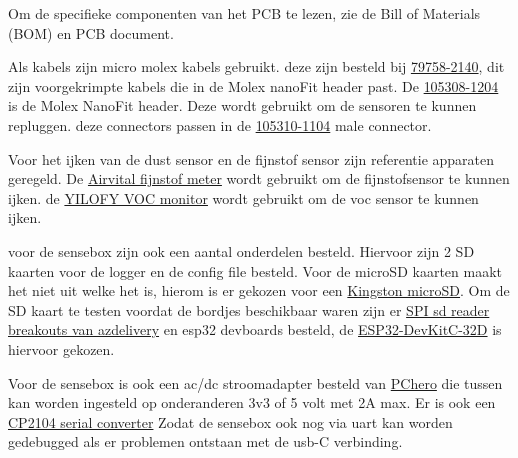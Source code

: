 Om de specifieke componenten van het PCB te lezen, zie de Bill of Materials (BOM) en PCB document.\vspace{1em}

Als kabels zijn micro molex kabels gebruikt. deze zijn besteld bij \href{https://eu.mouser.com/ProductDetail/Molex/79758-2140?qs=d0WKAl\%252BL4KbSUmFUgUy5Sg\%3D\%3D}{79758-2140}, dit zijn voorgekrimpte kabels die in de Molex nanoFit header past. De \href{https://nl.mouser.com/ProductDetail/Molex/105308-1204?qs=PqFvFmEiOr5yxx9OZCbUfg\%3D\%3D&countrycode=DE&currencycode=EUR}{105308-1204} is de Molex NanoFit header. Deze wordt gebruikt om de sensoren te kunnen repluggen. deze connectors passen in de \href{https://nl.mouser.com/ProductDetail/Molex/105310-1104?qs=PqFvFmEiOr6mewoWpXKrGw\%3D\%3D}{105310-1104} male connector.\vspace{1em}

Voor het ijken van de dust sensor en de fijnstof sensor zijn referentie apparaten geregeld. De \href{https://www.bol.com/nl/nl/p/airvital-fijnstofmeter-luchtkwaliteitsmeter-pm2-5/9300000024155194/?s2a=}{Airvital fijnstof meter} wordt gebruikt om de fijnstofsensor te kunnen ijken. de \href{https://www.bol.com/nl/nl/p/yilofy-professionele-5-in-1-luchtkwaliteitsmeter-hygrometer-co2-meter-horeca-draagbaar-lcd-scherm-monitor-co2-luchtvochtigheidsmeter-sensor-melder-temperatuur-thermometer-binnen-buiten-oplaadbaar-usb-kabel/9300000054426695/?s2a=}{YILOFY VOC monitor} wordt gebruikt om de voc sensor te kunnen ijken.\vspace{1em}

voor de sensebox zijn ook een aantal onderdelen besteld. Hiervoor zijn 2 SD kaarten voor de logger en de config file besteld. Voor de microSD kaarten maakt het niet uit welke het is, hierom is er gekozen voor een \href{https://www.bol.com/nl/nl/p/micro-sd-kaart-zwart-32gb-adapter-class-10/9200000064927040/?s2a=}{Kingston microSD}. Om de SD kaart te testen voordat de bordjes beschikbaar waren zijn er \href{https://www.amazon.nl/gp/product/B077MCQS9P/ref=ppx_yo_dt_b_asin_title_o08_s00?ie=UTF8&psc=1}{SPI sd reader breakouts van azdelivery} en esp32 devboards besteld, de \href{https://nl.mouser.com/ProductDetail/Espressif-Systems/ESP32-DevKitC-32D?qs=\%252BEew9\%252B0nqrDsObWEpDx6YQ\%3D\%3D}{ESP32-DevKitC-32D} is hiervoor gekozen.\vspace{1em}

Voor de sensebox is ook een ac/dc stroomadapter besteld van \href{https://www.amazon.nl/gp/product/B079P8G5FX/ref=ppx_yo_dt_b_asin_title_o03_s00?ie=UTF8&psc=1}{PChero} die tussen kan worden ingesteld op onderanderen 3v3 of 5 volt met 2A max. Er is ook een \href{https://www.amazon.nl/gp/product/B07N978W56/ref=ppx_yo_dt_b_asin_title_o04_s00?ie=UTF8&psc=1}{CP2104 serial converter} Zodat de sensebox ook nog via uart kan worden gedebugged als er problemen ontstaan met de usb-C verbinding. 
